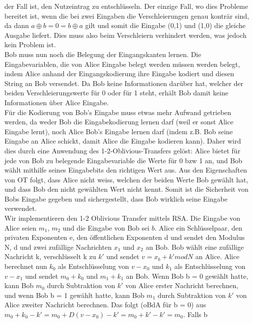 \documentclass{article}
\begin{document}
der Fall ist, den Nutzeintrag zu entschl\"usseln. Der einzige Fall, wo dies
Probleme bereitet ist, wenn die bei zwei Eingaben die Verschleierungen 
genau kontr\"ar sind, da dann \(a \oplus b = 0 = b \oplus a\) gilt
und somit die Eingabe (0,1) und (1,0) die gleiche Ausgabe liefert. Dies
muss also beim Verschleiern verhindert werden, was jedoch kein Problem ist.\\
Bob muss nun noch die Belegung der Eingangskanten lernen. Die
Eingabevariablen, die von Alice Eingabe belegt werden m\"ussen werden
belegt, indem Alice anhand der Eingangskodierung ihre Eingabe kodiert
und diesen String an Bob versendet. Da Bob keine Informationen dar\"uber
hat, welcher der beiden Verschleierungswerte f\"ur 0 oder f\"ur 1 steht,
erh\"alt Bob damit keine Informationen \"uber Alice Eingabe.\\
F\"ur die Kodierung von Bob's Eingabe muss etwas mehr Aufwand getrieben
werden, da weder Bob die Eingabekodierung lernen darf (weil er sonst
Alice Eingabe lernt), noch Alice Bob's Eingabe lernen darf (indem z.B.
Bob seine Eingabe an Alice schickt, damit Alice die Eingabe kodieren kann).
Daher wird dies durch eine Anwendung des 1-2-Oblivious-Transfers gel\"ost:
Alice bietet f\"ur jede von Bob zu belegende Eingabevariable die Werte
f\"ur 0 bzw 1 an, und Bob w\"ahlt mithilfe seines Eingabebits den richtigen
Wert aus. Aus den Eigenschaften von OT folgt, dass Alice nicht weiss, welchen
der beiden Werte Bob gew\"ahlt hat, und dass Bob den nicht gew\"ahlten Wert
nicht kennt. Somit ist die Sicherheit von Bobs Eingabe gegeben und 
sichergestellt, dass Bob wirklich seine Eingabe verwendet.\\
Wir implementieren den 1-2 Oblivious Transfer mittels RSA. Die Eingabe
von Alice seien \(m_1\), \(m_2\) und die Eingabe von Bob sei \(b\).
Alice ein Schl\"usselpaar, den privaten Exponenten e, den
\"offentlichen Exponenten d und sendet den Modulus N, d und zwei zuf\"allige
Nachrichten \(x_1\) und \(x_2\) an Bob. Bob w\"ahlt eine zuf\"allige Nachricht
k, verschl\"usselt k zu \(k'\) und sendet \(v = x_b + k' mod N\) an Alice. 
Alice berechnet nun \(k_0\) als Entschl\"usselung von \(v - x_0\) und 
\(k_1\) als Entschl\"usselung von \(v - x_1\) und sendet \(m_0 + k_0\) und
\(m_1 + k_1\) an Bob. Wenn Bob b = 0 gew\"ahlt hatte, kann Bob \(m_0\)
durch Subtraktion von \(k'\) von Alice erster Nachricht berechnen, und wenn
Bob b = 1 gew\"ahlt hatte, kann Bob \(m_1\) durch Subtraktion von \(k'\) von
Alice zweiter Nachricht berechnen. Das folgt (oBdA f\"ur b = 0) aus
\(m_0 + k_0 - k' = m_0 + D(v - x_0) - k' = m_0 + k' - k' = m_0\). Falls b 
\end{document}
